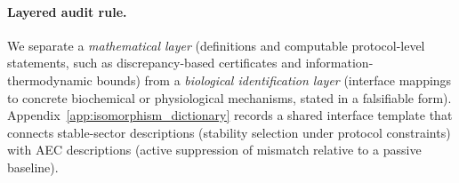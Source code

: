 \paragraph{Layered audit rule.}
We separate a \emph{mathematical layer} (definitions and computable protocol-level statements, such as discrepancy-based certificates and information-thermodynamic bounds) from a \emph{biological identification layer} (interface mappings to concrete biochemical or physiological mechanisms, stated in a falsifiable form).
Appendix~\ref{app:isomorphism_dictionary} records a shared interface template that connects stable-sector descriptions (stability selection under protocol constraints) with AEC descriptions (active suppression of mismatch relative to a passive baseline).

\tableofcontents
\newpage


